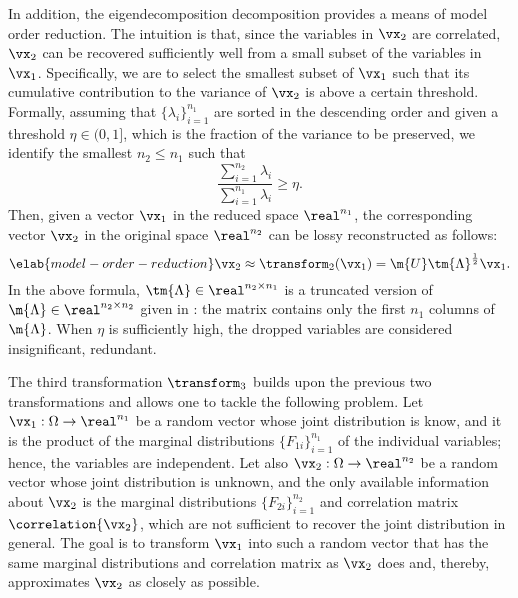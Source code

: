 In addition, the eigendecomposition decomposition provides a means of model
order reduction. The intuition is that, since the variables in $\vx_2$ are
correlated, $\vx_2$ can be recovered sufficiently well from a small subset of
the variables in $\vx_1$. Specifically, we are to select the smallest subset of
$\vx_1$ such that its cumulative contribution to the variance of $\vx_2$ is
above a certain threshold. Formally, assuming that $\{ \lambda_i \}_{i =
1}^{n_1}$ are sorted in the descending order and given a threshold $\eta \in (0,
1]$, which is the fraction of the variance to be preserved, we identify the
smallest $n_2 \leq n_1$ such that
\[
  \frac{\sum_{i = 1}^{n_2} \lambda_i}{\sum_{i = 1}^{n_1} \lambda_i} \geq \eta.
\]
Then, given a vector $\vx_1$ in the reduced space $\real^{n_1}$, the
corresponding vector $\vx_2$ in the original space $\real^{n_2}$ can be lossy
reconstructed as follows:
\begin{equation} \elab{model-order-reduction}
  \vx_2 \approx \transform_2(\vx_1) = \m{U} \tm{\Lambda}^\frac{1}{2} \vx_1.
\end{equation}
In the above formula, $\tm{\Lambda} \in \real^{n_2 \times n_1}$ is a truncated
version of $\m{\Lambda} \in \real^{n_2 \times n_2}$ given in
: the matrix contains only the first $n_1$ columns of
$\m{\Lambda}$. When $\eta$ is sufficiently high, the dropped variables are
considered insignificant, redundant.

The third transformation $\transform_3$ builds upon the previous two
transformations and allows one to tackle the following problem. Let $\vx_1:
\Omega \to \real^{n_1}$ be a random vector whose joint distribution is know, and
it is the product of the marginal distributions $\{ F_{1i} \}_{i = 1}^{n_1}$ of
the individual variables; hence, the variables are independent. Let also $\vx_2:
\Omega \to \real^{n_2}$ be a random vector whose joint distribution is unknown,
and the only available information about $\vx_2$ is the marginal distributions
$\{ F_{2i} \}_{i = 1}^{n_2}$ and correlation matrix $\correlation{\vx_2}$, which
are not sufficient to recover the joint distribution in general. The goal is to
transform $\vx_1$ into such a random vector that has the same marginal
distributions and correlation matrix as $\vx_2$ does and, thereby, approximates
$\vx_2$ as closely as possible.

